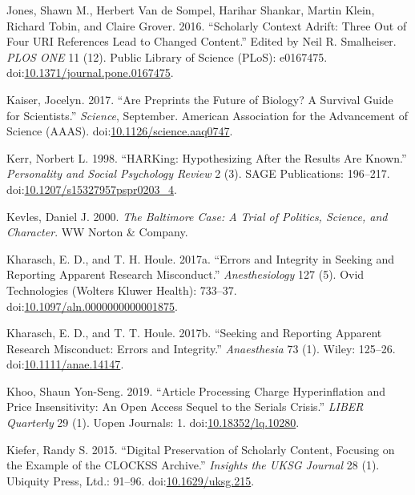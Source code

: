 \documentclass[a5paper]{book}
\begin{document}
\hypertarget{ref-doi:10.1371ux2fjournal.pone.0167475}{}
Jones, Shawn M., Herbert Van de Sompel, Harihar Shankar, Martin Klein,
Richard Tobin, and Claire Grover. 2016. ``Scholarly Context Adrift:
Three Out of Four URI References Lead to Changed Content.'' Edited by
Neil R. Smalheiser. \emph{PLOS ONE} 11 (12). Public Library of Science
(PLoS): e0167475.
doi:\href{https://doi.org/10.1371/journal.pone.0167475}{10.1371/journal.pone.0167475}.

\hypertarget{ref-doi:10.1126ux2fscience.aaq0747}{}
Kaiser, Jocelyn. 2017. ``Are Preprints the Future of Biology? A Survival
Guide for Scientists.'' \emph{Science}, September. American Association
for the Advancement of Science (AAAS).
doi:\href{https://doi.org/10.1126/science.aaq0747}{10.1126/science.aaq0747}.

\hypertarget{ref-doi:10.1207ux2fs15327957pspr0203_4}{}
Kerr, Norbert L. 1998. ``HARKing: Hypothesizing After the Results Are
Known.'' \emph{Personality and Social Psychology Review} 2 (3). SAGE
Publications: 196--217.
doi:\href{https://doi.org/10.1207/s15327957pspr0203_4}{10.1207/s15327957pspr0203\_4}.

\hypertarget{ref-isbn:9780393319705}{}
Kevles, Daniel J. 2000. \emph{The Baltimore Case: A Trial of Politics,
Science, and Character}. WW Norton \& Company.

\hypertarget{ref-doi:10.1097ux2faln.0000000000001875}{}
Kharasch, E. D., and T. H. Houle. 2017a. ``Errors and Integrity in
Seeking and Reporting Apparent Research Misconduct.''
\emph{Anesthesiology} 127 (5). Ovid Technologies (Wolters Kluwer
Health): 733--37.
doi:\href{https://doi.org/10.1097/aln.0000000000001875}{10.1097/aln.0000000000001875}.

\hypertarget{ref-doi:10.1111ux2fanae.14147}{}
Kharasch, E. D., and T. T. Houle. 2017b. ``Seeking and Reporting
Apparent Research Misconduct: Errors and Integrity.'' \emph{Anaesthesia}
73 (1). Wiley: 125--26.
doi:\href{https://doi.org/10.1111/anae.14147}{10.1111/anae.14147}.

\hypertarget{ref-doi:10.18352ux2flq.10280}{}
Khoo, Shaun Yon-Seng. 2019. ``Article Processing Charge Hyperinflation
and Price Insensitivity: An Open Access Sequel to the Serials Crisis.''
\emph{LIBER Quarterly} 29 (1). Uopen Journals: 1.
doi:\href{https://doi.org/10.18352/lq.10280}{10.18352/lq.10280}.

\hypertarget{ref-doi:10.1629ux2fuksg.215}{}
Kiefer, Randy S. 2015. ``Digital Preservation of Scholarly Content,
Focusing on the Example of the CLOCKSS Archive.'' \emph{Insights the
UKSG Journal} 28 (1). Ubiquity Press, Ltd.: 91--96.
doi:\href{https://doi.org/10.1629/uksg.215}{10.1629/uksg.215}.
\end{document}
